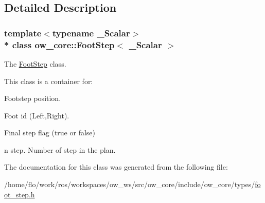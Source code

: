 \subsection{Detailed Description}
\subsubsection*{template$<$typename \+\_\+\+Scalar$>$\\*
class ow\+\_\+core\+::\+Foot\+Step$<$ \+\_\+\+Scalar $>$}

The \hyperlink{classow__core_1_1FootStep}{Foot\+Step} class. 

This class is a container for\+:
\begin{DoxyItemize}
\item Footstep position.
\item Foot id (Left,Right).
\item Final step flag (true or false)
\item n step. Number of step in the plan. 
\end{DoxyItemize}

The documentation for this class was generated from the following file\+:\begin{DoxyCompactItemize}
\item 
/home/flo/work/ros/workspaces/ow\+\_\+ws/src/ow\+\_\+core/include/ow\+\_\+core/types/\hyperlink{foot__step_8h}{foot\+\_\+step.\+h}\end{DoxyCompactItemize}
